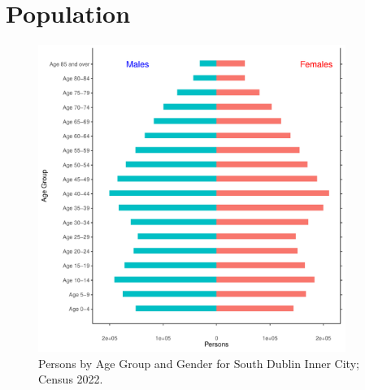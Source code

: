 \documentclass{article}
\begin{document}
\pagebreak

\section{Population} 
\label{sect:Pop}

\begin{figure}[h]
	\centering
	\includegraphics[width = 100mm]{../figures/PyramidPlot.pdf}
	\caption{Persons by Age Group and Gender for South Dublin Inner City; Census 2022.}
	\label{fig:2ae19629-1a6a-13a3-e055-000000000001}
	\end{figure}
\end{document}
